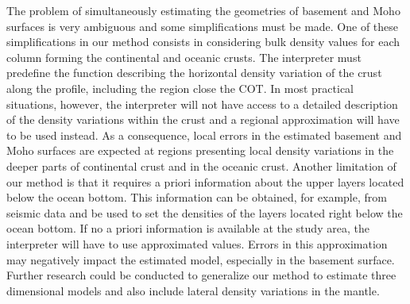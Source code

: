 \documentclass[manuscript]{geophysics}
\begin{document}
The problem of simultaneously estimating the geometries of basement and Moho surfaces
is very ambiguous and some simplifications must be made. 
One of these simplifications in our method consists in considering bulk density 
values for each column forming the continental and oceanic crusts. 
The interpreter must predefine the function describing the horizontal density
variation of the crust along the profile, including the region 
close the COT.
In most practical situations, however, the interpreter will not have access to a detailed
description of the density variations within the crust and a regional approximation
will have to be used instead.
As a consequence, local errors in the estimated basement and Moho surfaces are expected 
at regions presenting local density variations in the deeper parts of continental crust 
and in the oceanic crust.
Another limitation of our method is that it requires a priori information about the
upper layers located below the ocean bottom.
This information can be obtained, for example, from seismic data and be used to set
the densities of the layers located right below the ocean bottom.
If no a priori information is available at the study area, the interpreter will have to use
approximated values.
Errors in this approximation may negatively impact the estimated model, especially in 
the basement surface.
Further research could be conducted to generalize our method to estimate
three dimensional models and also include lateral density variations in 
the mantle.


\end{document}
